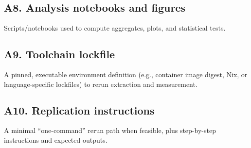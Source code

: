 \subsection*{A8. Analysis notebooks and figures}
Scripts/notebooks used to compute aggregates, plots, and statistical tests.

\subsection*{A9. Toolchain lockfile}
A pinned, executable environment definition (e.g., container image digest, Nix, or language-specific lockfiles) to rerun extraction and measurement.

\subsection*{A10. Replication instructions}
A minimal ``one-command'' rerun path when feasible, plus step-by-step instructions and expected outputs.